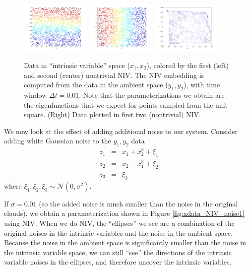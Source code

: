 \documentclass[12pt]{article}
\begin{document}
\begin{figure}[H]
\includegraphics[width=0.3\textwidth]{xdata_colored_NIV1}
\includegraphics[width=0.3\textwidth]{xdata_colored_NIV2}
\includegraphics[width=0.3\textwidth]{embedding_NIV}
\caption{Data in ``intrinsic variable'' space ($x_1, x_2$), colored by the first (left) and second (center) nontrivial NIV. The NIV embedding is computed from the data in the ambient space ($y_1, y_2$), with time window $\Delta t = 0.01$. Note that the parameterizations we obtain are the eigenfunctions that we expect for points sampled from the unit square. (Right) Data plotted in first two (nontrivial) NIV.}
\label{fig:xdata_NIV}
\end{figure}

We now look at the effect of adding additional noise to our system.
%
Consider adding white Gaussian noise to the $y_1, y_2$ data
\begin{eqnarray}
z_1 & = & x_1 + x_2^3 + \xi_1 \\
z_2 & = & x_2 - x_1^3 + \xi_2 \\
z_3 & = & \xi_3
\end{eqnarray}
where $\xi_1, \xi_2, \xi_3 \sim \mathcal{N}(0, \sigma^2)$.

If $\sigma = 0.01$ (so the added noise is much smaller than the noise in the original clouds), we obtain a parameterization shown in Figure \ref{fig:xdata_NIV_noise1} using NIV.
%
When we do NIV, the ``ellipses'' we see are a combination of the original noises in the intrinsic variables and the noise in the ambient space.
%
Because the noise in the ambient space is significantly smaller than the noise in the intrinsic variable space, we can still ``see'' the directions of the intrinsic variable noises in the ellipses, and therefore uncover the intrinsic variables.
\end{document}

